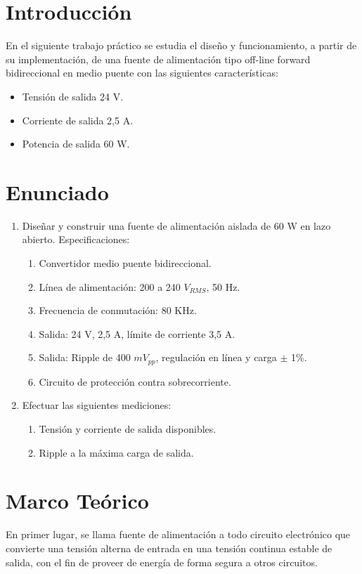 \documentclass[11pt, a4paper]{article}
\begin{document}
	
	\tableofcontents


\section{Introducción}
En el siguiente trabajo práctico se estudia el diseño y funcionamiento, a partir de su implementación, de una fuente de alimentación tipo off-line forward bidireccional en medio puente con las siguientes características:
\begin{itemize}
	\item Tensión de salida 24 V.
	\item Corriente de salida 2,5 A.
	\item Potencia de salida 60 W.
\end{itemize}

\section{Enunciado}
\begin{enumerate}
	\item Diseñar y construir una fuente de alimentación aislada de 60 W en lazo abierto. Especificaciones:
		\begin{enumerate}
			\item Convertidor medio puente bidireccional.
			\item Línea de alimentación: 200 a 240 $V_{RMS}$, 50 Hz.
			\item Frecuencia de conmutación: 80 KHz.
			\item Salida: 24 V, 2,5 A, límite de corriente 3,5 A.
			\item Salida: Ripple de 400 $mV_{pp}$, regulación en línea y carga $\pm$ 1\%.
			\item Circuito de protección contra sobrecorriente. 
		\end{enumerate}
	\item Efectuar las siguientes mediciones:
		\begin{enumerate}
			\item Tensión y corriente de salida disponibles.
			\item Ripple a la máxima carga de salida.
		\end{enumerate}
\end{enumerate}


\section{Marco Teórico}
En primer lugar, se llama fuente de alimentación a todo circuito electrónico que convierte una tensión alterna de entrada en una tensión continua estable de salida, con el fin de proveer de energía de forma segura a otros circuitos.
\end{document}
